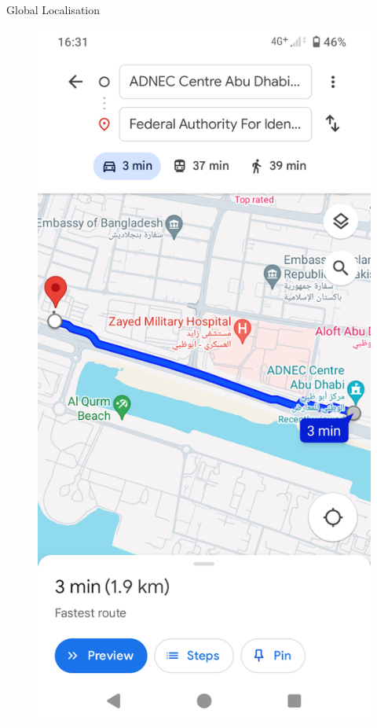 \begin{frame}[noframenumbering]{Global Localisation}

\begin{figure}[t!]
  \centering
  \includegraphics[scale=0.14]{./figures/02/google_maps.png}
\end{figure}

\end{frame}
